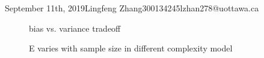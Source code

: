 \documentclass{article}
\begin{document}
\begin{lecture}{September 11th, 2019}{Lingfeng Zhang}{300134245}{lzhan278@uottawa.ca}
\begin{figure}[ht!]
\centering
{}
\caption{bias vs. variance tradeoff}
\label{fig:biasVarianceTradeoff}
\end{figure}

\begin{figure}[ht!]
\centering
{}
\caption{E varies with sample size in different complexity model}
\label{fig:sampleSizeE}
\end{figure}


\end{lecture}
\end{document}

